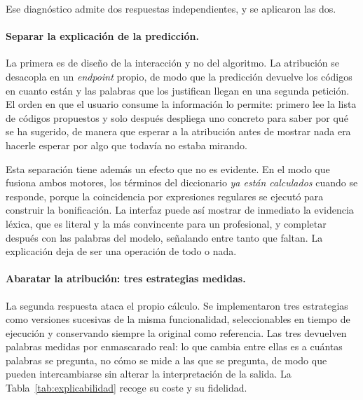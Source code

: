 Ese diagnóstico admite dos respuestas independientes, y se aplicaron las dos.

\paragraph{Separar la explicación de la predicción.}
La primera es de diseño de la interacción y no del algoritmo. La atribución se desacopla en un \emph{endpoint} propio, de modo que la predicción devuelve los códigos en cuanto están y las palabras que los justifican llegan en una segunda petición. El orden en que el usuario consume la información lo permite: primero lee la lista de códigos propuestos y solo después despliega uno concreto para saber por qué se ha sugerido, de manera que esperar a la atribución antes de mostrar nada era hacerle esperar por algo que todavía no estaba mirando.

Esta separación tiene además un efecto que no es evidente. En el modo que fusiona ambos motores, los términos del diccionario \emph{ya están calculados} cuando se responde, porque la coincidencia por expresiones regulares se ejecutó para construir la bonificación. La interfaz puede así mostrar de inmediato la evidencia léxica, que es literal y la más convincente para un profesional, y completar después con las palabras del modelo, señalando entre tanto que faltan. La explicación deja de ser una operación de todo o nada.

\paragraph{Abaratar la atribución: tres estrategias medidas.}
La segunda respuesta ataca el propio cálculo. Se implementaron tres estrategias como versiones sucesivas de la misma funcionalidad, seleccionables en tiempo de ejecución y conservando siempre la original como referencia. Las tres devuelven palabras medidas por enmascarado real: lo que cambia entre ellas es a cuántas palabras se pregunta, no cómo se mide a las que se pregunta, de modo que pueden intercambiarse sin alterar la interpretación de la salida. La Tabla~\ref{tab:explicabilidad} recoge su coste y su fidelidad.

